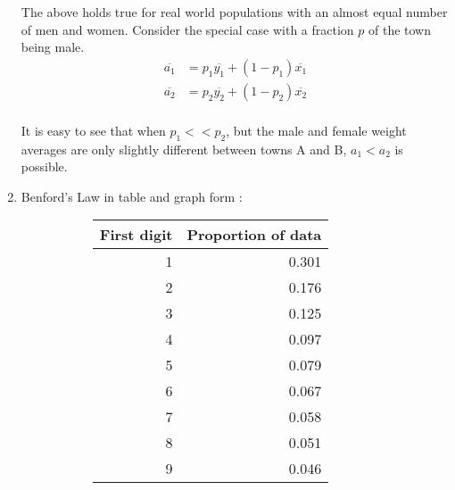 \begin{enumerate}
		The above holds true for real world populations with an almost equal number of men and women. Consider the special case with a fraction $ p $ of the town being male. 
		\begin{align}
			\overline{a_1} &= p_1 \overline{y_1} + (1 - p_1) \overline{x_1} \\
			\overline{a_2} &= p_2 \overline{y_2} + (1 - p_2) \overline{x_2} \\
		\end{align}
		
		It is easy to see that when $ p_1 << p_2 $, but the male and female weight averages are only slightly different between towns A and B, $ a_1 < a_2 $ is possible.
		
	
	\item Benford's Law in table and graph form : 
	\begin{figure}[H]
		\begin{subfigure}[]{0.45\linewidth}
			\centering
			\begin{table}[H]
				\centering
				\begin{tabular}{@{}rr@{}}
					\toprule
					First digit &  Proportion of data \\
					\midrule
					1 &               0.301 \\
					2 &               0.176 \\
					3 &               0.125 \\
					4 &               0.097 \\
					5 &               0.079 \\
					6 &               0.067 \\
					7 &               0.058 \\
					8 &               0.051 \\
					9 &               0.046 \\
					\bottomrule
				\end{tabular}
			\end{table}
		\end{subfigure}
		\begin{subfigure}[]{0.45\linewidth}
			\centering
		\end{subfigure} \\		
	\end{figure}
	

\end{enumerate}

